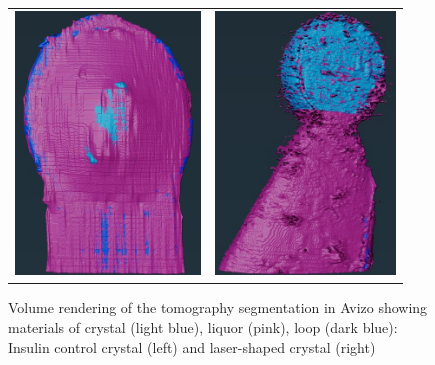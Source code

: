 \begin{figure}[h]
    \begin{tabular}{cc}
	\includegraphics[height=7cm]{images/avizo_flats/ins_con.jpg} & \includegraphics[height=7cm]{images/avizo_flats/ins_ls.jpg}
    \end{tabular}
	\caption{Volume rendering of the tomography segmentation in Avizo showing materials of crystal (light blue), liquor (pink), loop (dark blue): Insulin control crystal (left) and laser-shaped crystal (right)}
 \label{avizo_insulin}
\end{figure}


